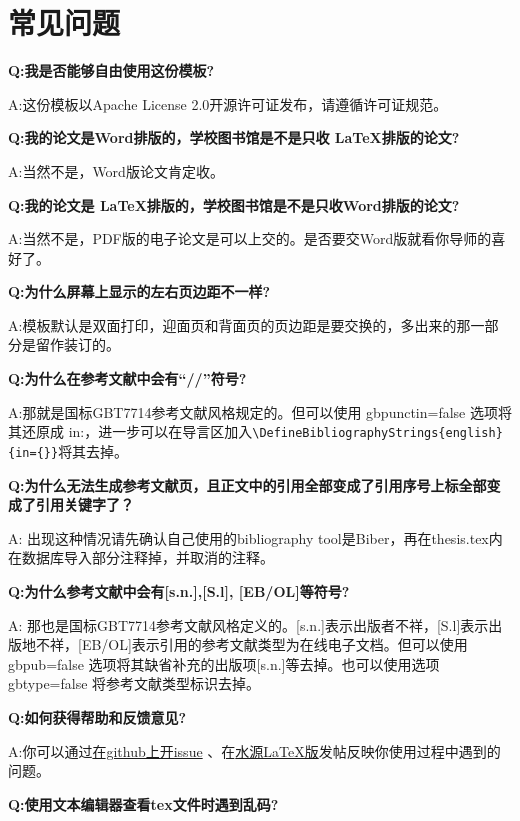 \chapter{常见问题}
\label{chap:faq}

{\bfseries{}Q:我是否能够自由使用这份模板?}

A:这份模板以Apache License 2.0开源许可证发布，请遵循许可证规范。

{\bfseries{}Q:我的论文是Word排版的，学校图书馆是不是只收 \LaTeX 排版的论文?}

A:当然不是，Word版论文肯定收。

{\bfseries{}Q:我的论文是 \LaTeX 排版的，学校图书馆是不是只收Word排版的论文?}

A:当然不是，PDF版的电子论文是可以上交的。是否要交Word版就看你导师的喜好了。

{\bfseries{}Q:为什么屏幕上显示的左右页边距不一样?}

A:模板默认是双面打印，迎面页和背面页的页边距是要交换的，多出来的那一部分是留作装订的。

{\bfseries{}Q:为什么在参考文献中会有“//”符号?}

A:那就是国标GBT7714参考文献风格规定的。但可以使用 gbpunctin=false 选项将其还原成 in:，进一步可以在导言区加入\verb+\DefineBibliographyStrings{english}{in={}}+将其去掉。

{\bfseries{}Q:为什么无法生成参考文献页，且正文中的引用全部变成了引用序号上标全部变成了引用关键字了？}

A: 出现这种情况请先确认自己使用的bibliography tool是Biber，再在thesis.tex内在数据库导入部分注释掉\verb||，并取消\verb||的注释。

{\bfseries{}Q:为什么参考文献中会有[s.n.],[S.l], [EB/OL]等符号?}

A: 那也是国标GBT7714参考文献风格定义的。[s.n.]表示出版者不祥，[S.l]表示出版地不祥，[EB/OL]表示引用的参考文献类型为在线电子文档。但可以使用gbpub=false 选项将其缺省补充的出版项[s.n.]等去掉。也可以使用选项 gbtype=false 将参考文献类型标识去掉。

{\bfseries{}Q:如何获得帮助和反馈意见?}

A:你可以通过\href{https://github.com/sjtug/SJTUThesis/issues}{在github上开issue}
、在\href{https://bbs.sjtu.edu.cn/bbsdoc?board=TeX_LaTeX}{水源LaTeX版}发帖反映你使用过程中遇到的问题。

{\bfseries{}Q:使用文本编辑器查看tex文件时遇到乱码?}

